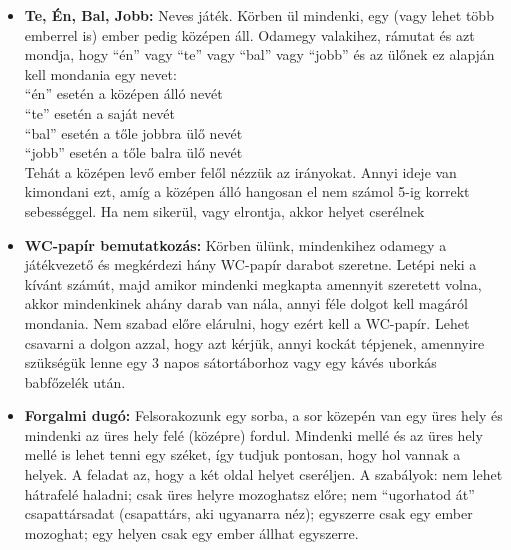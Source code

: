 \documentclass[a4paper, 12pt, twoside, openright]{article}
\begin{document}
\begin{itemize}
\item \textbf{Te, Én, Bal, Jobb:} Neves játék. Körben ül mindenki, egy (vagy lehet több emberrel is) ember pedig középen áll. Odamegy valakihez, rámutat és azt mondja, hogy ``én'' vagy ``te'' vagy ``bal'' vagy ``jobb'' és az ülőnek ez alapján kell mondania egy nevet:\\
``én'' esetén a középen álló nevét\\
``te'' esetén a saját nevét\\
``bal'' esetén a tőle jobbra ülő nevét\\
``jobb'' esetén a tőle balra ülő nevét\\
Tehát a középen levő ember felől nézzük az irányokat. Annyi ideje van kimondani ezt, amíg a középen álló hangosan el nem számol 5-ig korrekt sebességgel. Ha nem sikerül, vagy elrontja, akkor helyet cserélnek

\item \textbf{WC-papír bemutatkozás:} Körben ülünk, mindenkihez odamegy a játékvezető és megkérdezi hány WC-papír darabot szeretne. Letépi neki a kívánt számút, majd amikor mindenki megkapta amennyit szeretett volna, akkor mindenkinek ahány darab van nála, annyi féle dolgot kell magáról mondania. Nem szabad előre elárulni, hogy ezért kell a WC-papír. Lehet csavarni a dolgon azzal, hogy azt kérjük, annyi kockát tépjenek, amennyire szükségük lenne egy 3 napos sátortáborhoz vagy egy kávés uborkás babfőzelék után.

\item \textbf{Forgalmi dugó:} Felsorakozunk egy sorba, a sor közepén van egy üres hely és mindenki az üres hely felé (középre) fordul. Mindenki mellé és az üres hely mellé is lehet tenni egy széket, így tudjuk pontosan, hogy hol vannak a helyek. A feladat az, hogy a két oldal helyet cseréljen. A szabályok: nem lehet hátrafelé haladni; csak üres helyre mozoghatsz előre; nem ``ugorhatod át'' csapattársadat (csapattárs, aki ugyanarra néz); egyszerre csak egy ember mozoghat; egy helyen csak egy ember állhat egyszerre.


\end{itemize}
\end{document}
